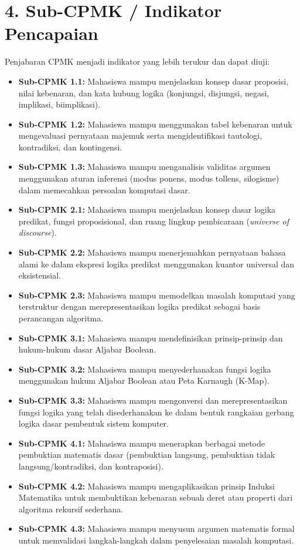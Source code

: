 \documentclass[12pt,a4paper]{article}
\begin{document}
\section*{4. Sub-CPMK / Indikator Pencapaian}

Penjabaran CPMK menjadi indikator yang lebih terukur dan dapat diuji:

\begin{itemize}[leftmargin=*]
  \item \textbf{Sub-CPMK 1.1:} Mahasiswa mampu menjelaskan konsep dasar proposisi, nilai kebenaran, dan kata hubung logika (konjungsi, disjungsi, negasi, implikasi, biimplikasi).
  \item \textbf{Sub-CPMK 1.2:} Mahasiswa mampu menggunakan tabel kebenaran untuk mengevaluasi pernyataan majemuk serta mengidentifikasi tautologi, kontradiksi, dan kontingensi.
  \item \textbf{Sub-CPMK 1.3:} Mahasiswa mampu menganalisis validitas argumen menggunakan aturan inferensi (modus ponens, modus tollens, silogisme) dalam memecahkan persoalan komputasi dasar.
  
  \item \textbf{Sub-CPMK 2.1:} Mahasiswa mampu menjelaskan konsep dasar logika predikat, fungsi proposisional, dan ruang lingkup pembicaraan (\textit{universe of discourse}).
  \item \textbf{Sub-CPMK 2.2:} Mahasiswa mampu menerjemahkan pernyataan bahasa alami ke dalam ekspresi logika predikat menggunakan kuantor universal dan eksistensial.
  \item \textbf{Sub-CPMK 2.3:} Mahasiswa mampu memodelkan masalah komputasi yang terstruktur dengan merepresentasikan logika predikat sebagai basis perancangan algoritma.
  
  \item \textbf{Sub-CPMK 3.1:} Mahasiswa mampu mendefinisikan prinsip-prinsip dan hukum-hukum dasar Aljabar Boolean.
  \item \textbf{Sub-CPMK 3.2:} Mahasiswa mampu menyederhanakan fungsi logika menggunakan hukum Aljabar Boolean atau Peta Karnaugh (K-Map).
  \item \textbf{Sub-CPMK 3.3:} Mahasiswa mampu mengonversi dan merepresentasikan fungsi logika yang telah disederhanakan ke dalam bentuk rangkaian gerbang logika dasar pembentuk sistem komputer.
  
  \item \textbf{Sub-CPMK 4.1:} Mahasiswa mampu menerapkan berbagai metode pembuktian matematis dasar (pembuktian langsung, pembuktian tidak langsung/kontradiksi, dan kontraposisi).
  \item \textbf{Sub-CPMK 4.2:} Mahasiswa mampu mengaplikasikan prinsip Induksi Matematika untuk membuktikan kebenaran sebuah deret atau properti dari algoritma rekursif sederhana.
  \item \textbf{Sub-CPMK 4.3:} Mahasiswa mampu menyusun argumen matematis formal untuk memvalidasi langkah-langkah dalam penyelesaian masalah komputasi.
\end{itemize}
\end{document}
